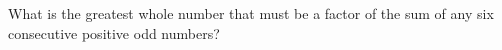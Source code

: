 What is the greatest whole number that must be a factor of the sum of any six consecutive positive odd numbers?
